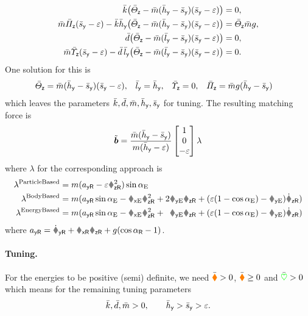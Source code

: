 \begin{subequations}
\begin{align}
 \kc \big( \Jcz - \mc(\hcy - \scy)(\scy - \eps) \big) &= 0,
\\
 \mc \kapcz (\scy-\eps) - \kc\hcy \big( \Jcz - \mc (\hcy - \scy)(\scy - \eps) \big) &= \Jcz \mc \gravityAccConst, 
\\
 \dc \big( \Jcz - \mc(\lcy - \scy)(\scy - \eps) \big) &= 0,
\\
 \mc \sigcz (\scy-\eps) - \dc\,\lcy \big( \Jcz - \mc (\lcy - \scy)(\scy - \eps) \big) &= 0.
\end{align}
\end{subequations}
One solution for this is
\begin{align}\label{eq:PVTOLMatchingSolution}
 \Jcz &= \mc(\hcy - \scy)(\scy - \eps),&
 \lcy &= \hcy,&
 \sigcz &= 0,&
 \kapcz &= \mc \gravityAccConst (\hcy-\scy)
\end{align}
which leaves the parameters $\kc, \dc, \mc, \hcy, \scy$ for tuning.
The resulting matching force is
\begin{align}
 \tilde{\sysForce} = \frac{\mc(\hcy-\scy)}{m(\hcy-\eps)} \begin{bmatrix} 1 \\ 0 \\ -\eps \end{bmatrix} \lambda
\end{align}
where $\lambda$ for the corresponding approach is
\begin{subequations}
\begin{align}
 \lambda^{\text{ParticleBased}} &= m(a_{\idxY\idxRef} - \eps\wzR^2)\sin\tiltAngleE
\\
 \lambda^{\text{BodyBased}} &= m(a_{\idxY\idxRef}\sin\tiltAngleE - \rxE\wzR^2 + 2\vyE\wzR + (\eps(1-\cos\tiltAngleE)-\ryE)\wzRd)
\\
 \lambda^{\text{EnergyBased}} &= m(a_{\idxY\idxRef}\sin\tiltAngleE - \rxE\wzR^2 +\phantom{2}\vyE\wzR + (\eps(1-\cos\tiltAngleE)-\ryE)\wzRd)
\end{align} 
\end{subequations}
where $a_{\idxY\idxRef} = \vyRd + \vxR\wzR + \gravityAccConst(\cos\tiltAngleR - 1)$. 

\paragraph{Tuning.}
For the energies to be positive (semi) definite, we need $\sysInertiaMatC > 0$, $\sysDissMatC \geq 0$ and $\potentialEnergyC > 0$ which means for the remaining tuning parameters
\begin{align}
 \kc, \dc, \mc > 0, \qquad \hcy > \scy > \eps.
\end{align}

